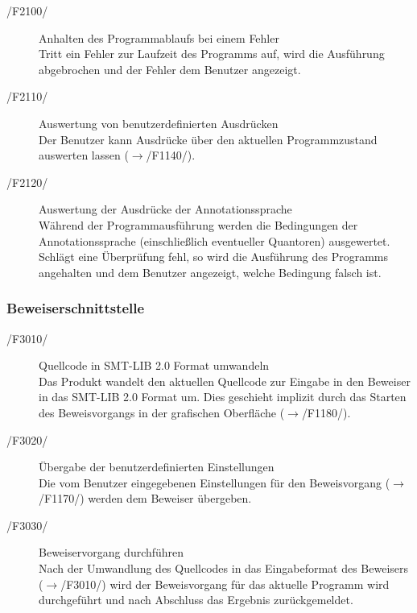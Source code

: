 \documentclass[a4paper,10pt]{article}
\begin{document}
\begin{description}
\item[/F2100/] Anhalten des Programmablaufs bei einem Fehler\\
Tritt ein Fehler zur Laufzeit des Programms auf, wird die Ausf\"{u}hrung abgebrochen und der Fehler dem Benutzer angezeigt.
\item[/F2110/] Auswertung von benutzerdefinierten Ausdr\"{u}cken\\
Der Benutzer kann Ausdr\"{u}cke \"{u}ber den aktuellen Programmzustand auswerten lassen ($\to$/F1140/).
\item[/F2120/] Auswertung der Ausdr\"{u}cke der Annotationssprache\\
W\"{a}hrend der Programmausf\"{u}hrung werden die Bedingungen der Annotationssprache (einschließlich eventueller Quantoren) ausgewertet. Schl\"{a}gt eine \"{U}berpr\"{u}fung fehl, so wird die Ausf\"{u}hrung des Programms angehalten und dem Benutzer angezeigt, welche Bedingung falsch ist.
\end{description}

\subsubsection{Beweiserschnittstelle}
\begin{description}
\item[/F3010/] Quellcode in SMT-LIB 2.0 Format umwandeln\\
Das Produkt wandelt den aktuellen Quellcode zur Eingabe in den Beweiser in das SMT-LIB 2.0 Format um. Dies geschieht implizit durch das Starten des Beweisvorgangs in der grafischen Oberfläche ($\to$/F1180/).
\item[/F3020/] Übergabe der benutzerdefinierten Einstellungen\\
Die vom Benutzer eingegebenen Einstellungen für den Beweisvorgang ($\to$/F1170/) werden dem Beweiser übergeben.
\item[/F3030/] Beweiservorgang durchf\"{u}hren\\
Nach der Umwandlung des Quellcodes in das Eingabeformat des Beweisers ($\to$/F3010/) wird der Beweisvorgang f\"{u}r das aktuelle Programm wird durchgef\"{u}hrt und nach Abschluss das Ergebnis zurückgemeldet.
\end{description}
\end{document}
